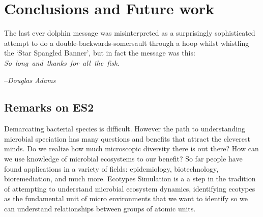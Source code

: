 \gobbletocpage
\chapter{Conclusions and Future work}
\restoretocpage

\begin{shadequote}
The last ever dolphin message was misinterpreted as a surprisingly sophisticated attempt to do a double-backwards-somersault through a hoop whilst whistling the `Star Spangled Banner', but in fact the message was this: \mbox{\emph{So long and thanks for all the fish}}. \par--\emph{Douglas Adams}
\end{shadequote}


\section{Remarks on ES2}
Demarcating bacterial species is difficult.
However the path to understanding microbial speciation has many questions and benefits that attract the cleverest minds.
Do we realize how much microscopic diversity there is out there?
How can we use knowledge of microbial ecosystems to our benefit?
So far people have found applications in a variety of fields: epidemiology, biotechnology, bioremediation, and much more.
Ecotypes Simulation is a a step in the tradition of attempting to understand microbial ecosystem dynamics, identifying ecotypes as the fundamental unit of micro environments that we want to identify so we can understand relationships between groups of atomic units.


